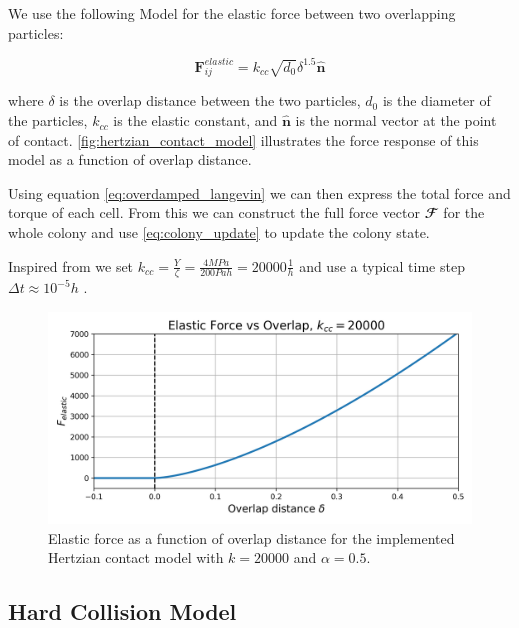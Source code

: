 \documentclass[conference]{IEEEtran}
\begin{document}
We use the following Model for the elastic force between two overlapping particles:

\begin{equation}
    \mathbf{F}^{elastic}_{ij} =k_{cc} \sqrt{d_0} \delta^{1.5} \hat{\mathbf{n}}
\end{equation}
\label{eq:hertzian_contact_model}

where $\delta$ is the overlap distance between the two particles, $d_0$ is the diameter of the particles, $k_{cc}$ is the elastic constant, and $\hat{\mathbf{n}}$ is the normal vector at the point of contact. \autoref{fig:hertzian_contact_model} illustrates the force response of this model as a function of overlap distance.

Using equation \autoref{eq:overdamped_langevin} we can then express the total force and torque of each cell. From this we can construct the full force vector $\mathbfcal{F}$ for the whole colony and use \autoref{eq:colony_update} to update the colony state.

Inspired from  \cite{You2018} we set $k_{cc} = \frac{Y}{\zeta} = \frac{4 MPa}{200 Pa h} = 20000 \frac{1}{h}$ and use a typical time step $\Delta t \approx 10^{-5} h$ \cite{Khan_2024}\cite{You2018}\cite{Blanchard2015}.


\begin{figure}[H]
    \centering
    \includegraphics[width=\linewidth]{figures/hertzian_contact_model.png}
    \caption{Elastic force as a function of overlap distance for the implemented Hertzian contact model with $k=20000$ and $\alpha=0.5$.}
    \label{fig:hertzian_contact_model}
\end{figure}

\newpage
\subsection{Hard Collision Model}
\end{document}
